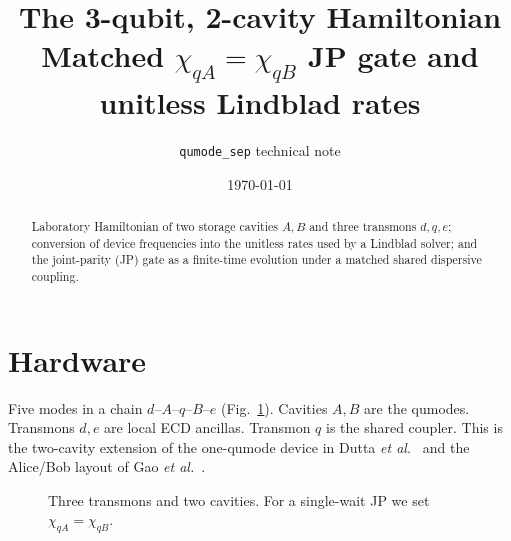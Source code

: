 \documentclass[11pt]{article}
\title{\textbf{The 3-qubit, 2-cavity Hamiltonian}\\
\large Matched $\chi_{qA}=\chi_{qB}$ JP gate and unitless Lindblad rates}
\author{\texorpdfstring{\texttt{qumode\_sep}}{qumode sep} technical note}
\date{\today}
\begin{document}
\maketitle

\begin{abstract}
Laboratory Hamiltonian of two storage cavities $A,B$ and three transmons
$d,q,e$; conversion of device frequencies into the unitless rates used by a
Lindblad solver; and the joint-parity (JP) gate as a finite-time evolution
under a matched shared dispersive coupling.
\end{abstract}

\section{Hardware}

Five modes in a chain $d$--$A$--$q$--$B$--$e$ (Fig.~\ref{fig:hardware}).
Cavities $A,B$ are the qumodes.  Transmons $d,e$ are local ECD ancillas.
Transmon $q$ is the shared coupler.  This is the two-cavity extension of the
one-qumode device in Dutta \emph{et al.}\ \cite{Dutta2025} and the Alice/Bob
layout of Gao \emph{et al.}\ \cite{Gao2018}.

\begin{figure}[H]
\centering
{}
\caption{Three transmons and two cavities.  For a single-wait JP we set
$\chi_{qA}=\chi_{qB}$.}
\label{fig:hardware}
\end{figure}
\end{document}
